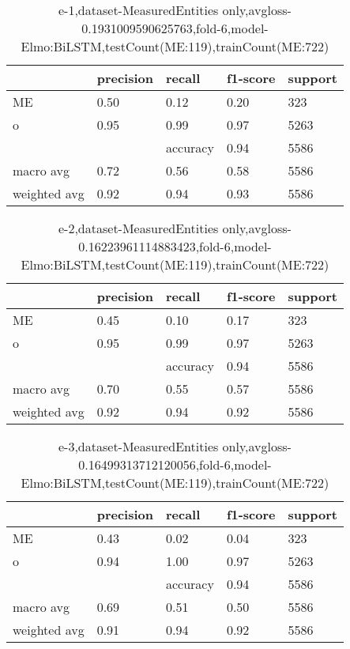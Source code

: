 \begin{table}[!ht] 
\centering
\caption{e-1,dataset-MeasuredEntities only,avgloss-0.1931009590625763,fold-6,model-Elmo:BiLSTM,testCount(ME:119),trainCount(ME:722)}\label{e-1data-meS.tsv}
\begin{tabularx}{300pt}{|X|X|X|X|X|}
\hline
&precision&recall&f1-score&support\\
\hline
ME&0.50&0.12&0.20&323\\
\hline
o&0.95&0.99&0.97&5263\\
\hline
&&accuracy&0.94&5586\\
\hline
macro avg&0.72&0.56&0.58&5586\\
\hline
weighted avg&0.92&0.94&0.93&5586\\
\hline
\end{tabularx}
\end{table}
\begin{table}[!ht] 
\centering
\caption{e-2,dataset-MeasuredEntities only,avgloss-0.16223961114883423,fold-6,model-Elmo:BiLSTM,testCount(ME:119),trainCount(ME:722)}\label{e-2data-meS.tsv}
\begin{tabularx}{300pt}{|X|X|X|X|X|}
\hline
&precision&recall&f1-score&support\\
\hline
ME&0.45&0.10&0.17&323\\
\hline
o&0.95&0.99&0.97&5263\\
\hline
&&accuracy&0.94&5586\\
\hline
macro avg&0.70&0.55&0.57&5586\\
\hline
weighted avg&0.92&0.94&0.92&5586\\
\hline
\end{tabularx}
\end{table}
\begin{table}[!ht] 
\centering
\caption{e-3,dataset-MeasuredEntities only,avgloss-0.16499313712120056,fold-6,model-Elmo:BiLSTM,testCount(ME:119),trainCount(ME:722)}\label{e-3data-meS.tsv}
\begin{tabularx}{300pt}{|X|X|X|X|X|}
\hline
&precision&recall&f1-score&support\\
\hline
ME&0.43&0.02&0.04&323\\
\hline
o&0.94&1.00&0.97&5263\\
\hline
&&accuracy&0.94&5586\\
\hline
macro avg&0.69&0.51&0.50&5586\\
\hline
weighted avg&0.91&0.94&0.92&5586\\
\hline
\end{tabularx}
\end{table}
